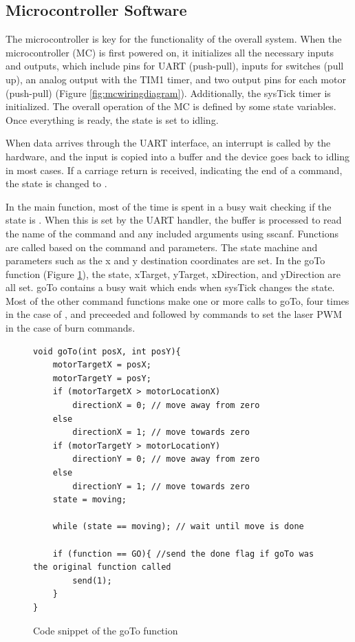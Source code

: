 \documentclass[11pt]{LaTeX-Classes/math-hw}
\begin{document}
\subsection{Microcontroller Software}
The microcontroller is key for the functionality of the overall system.
When the microcontroller (MC) is first powered on, it initializes all the necessary inputs and outputs,
which include pins for UART (push-pull), inputs for switches (pull up),
an analog output with the TIM1 timer,
and two output pins for each motor (push-pull) (Figure \ref{fig:mcwiringdiagram}).
Additionally, the sysTick timer is initialized. The overall operation of the MC is defined by some
state variables. Once everything is ready, the state is set to idling.

When data arrives through the UART interface, an interrupt is called by the hardware, and the
input is copied into a buffer and the device goes back to idling in most cases.
If a carriage return is received, indicating the end of a command,
the state is changed to .

In the main function, most of the time is spent in a busy wait checking if the state is .
When this is set by the UART handler,
the buffer is processed to read the name of the command and any included arguments using sscanf.
Functions are called based on the command and parameters.
The state machine and parameters such as the x and y destination coordinates are set.
In the goTo function (Figure \ref{fig:gotoFunction}), the state, xTarget, yTarget, xDirection,
and yDirection are all set.
goTo contains a busy wait which ends when sysTick changes the state.
Most of the other command functions make one or more calls to goTo,
four times in the case of , and preceeded and followed by
commands to set the laser PWM in the case of burn commands.

\begin{figure}[H]
 \begin{center}
   \begin{verbatim}
void goTo(int posX, int posY){
	motorTargetX = posX;
	motorTargetY = posY;
	if (motorTargetX > motorLocationX)
		directionX = 0; // move away from zero
	else
		directionX = 1; // move towards zero
	if (motorTargetY > motorLocationY)
		directionY = 0; // move away from zero
	else
		directionY = 1; // move towards zero
	state = moving;

	while (state == moving); // wait until move is done

	if (function == GO){ //send the done flag if goTo was the original function called
		send(1);
	}
}
   \end{verbatim}
   \caption{Code snippet of the goTo function}
   \label{fig:gotoFunction}
 \end{center}
\end{figure}
\end{document}

